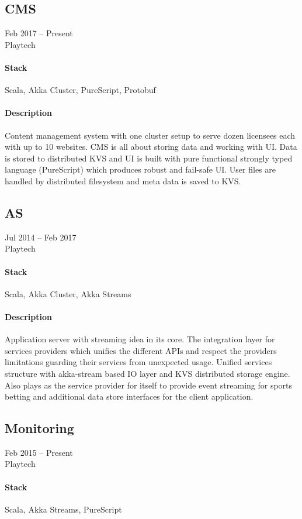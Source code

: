 \subsection{CMS}
Feb 2017 – Present\\Playtech
\paragraph{Stack} Scala, Akka Cluster, PureScript, Protobuf
\paragraph{Description}
Content management system with one cluster setup to serve dozen licensees each with up to 10 websites. CMS is all about storing data and working with UI. Data is stored to distributed KVS and UI is built with pure functional strongly typed language (PureScript) which produces robust and fail-safe UI. User files are handled by distributed filesystem and meta data is saved to KVS.

\subsection{AS}
Jul 2014 – Feb 2017\\Playtech
\paragraph{Stack} Scala, Akka Cluster, Akka Streams
\paragraph{Description}
Application server with streaming idea in its core. The integration layer for services providers which unifies the different APIs and respect the providers limitations guarding their services from unexpected usage. Unified services structure with akka-stream based IO layer and KVS distributed storage engine. Also plays as the service provider for itself to provide event streaming for sports betting and additional data store interfaces for the client application.

\subsection{Monitoring}
Feb 2015 – Present\\Playtech
\paragraph{Stack} Scala, Akka Streams, PureScript
